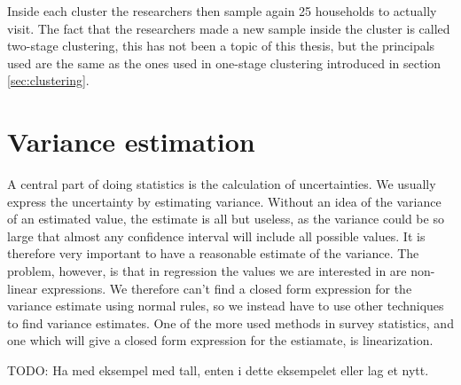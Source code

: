 \documentclass{article}
\begin{document}
Inside each cluster the researchers then sample again 25 households to actually
visit. The fact that the researchers made a new sample inside the cluster is
called two-stage clustering, this has not been a topic of this thesis, but the
principals used are the same as the ones used in one-stage clustering introduced
in section \ref{sec:clustering}.

\section{Variance estimation}

A central part of doing statistics is the calculation of uncertainties. We
usually express the uncertainty by estimating variance. Without an idea of the
variance of an estimated value, the estimate is all but useless, as the variance
could be so large that almost any confidence interval will include all possible
values. It is therefore very important to have a reasonable estimate of the
variance. The problem, however, is that in regression the values we are
interested in are non-linear expressions. We therefore can't find a closed form
expression for the variance estimate using normal rules, so we instead have to
use other techniques to
find variance estimates. One of the more used methods in survey
statistics, and one which will give a closed form expression for the estiamate,
is linearization.

TODO: Ha med eksempel med tall, enten i dette eksempelet eller lag et nytt.
\end{document}

